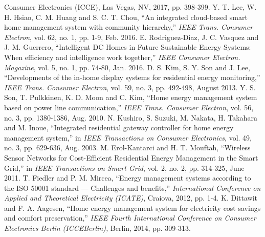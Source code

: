 \documentclass[a4paper,12pt,oneside]{article}
\begin{document}
\begin{thebibliography}{9}
{Consumer Electronics (ICCE)}, Las Vegas, NV, 2017, pp. 398-399.
Y. T. Lee, W. H. Hsiao, C. M. Huang and S. C. T. Chou, “An integrated
cloud-based smart home management system with community
hierarchy,” \emph{IEEE Trans. Consumer Electron}, vol. 62, no. 1, pp. 1-9, Feb.
2016.
E. Rodriguez-Diaz, J. C. Vasquez and J. M. Guerrero, “Intelligent DC
Homes in Future Sustainable Energy Systems: When efficiency and
intelligence work together,” \emph{IEEE Consumer Electron. Magazine}, vol. 5,
no. 1, pp. 74-80, Jan. 2016.
D. S. Kim, S. Y. Son and J. Lee, “Developments of the in-home display
systems for residential energy monitoring,” \emph{IEEE Trans. Consumer
Electron}, vol. 59, no. 3, pp. 492-498, August 2013.
Y. S. Son, T. Pulkkinen, K. D. Moon and C. Kim, “Home energy
management system based on power line communication,” \emph{IEEE Trans.
Consumer Electron}, vol. 56, no. 3, pp. 1380-1386, Aug. 2010.
N. Kushiro, S. Suzuki, M. Nakata, H. Takahara and M. Inoue,
“Integrated residential gateway controller for home energy management
system,” in\emph{ IEEE Transactions on Consumer Electronics}, vol. 49, no. 3,
pp. 629-636, Aug. 2003.
M. Erol-Kantarci and H. T. Mouftah, “Wireless Sensor Networks for
Cost-Efficient Residential Energy Management in the Smart Grid,” in\emph{
IEEE Transactions on Smart Grid}, vol. 2, no. 2, pp. 314-325, June 2011.
T. Fiedler and P. M. Mircea, “Energy management systems according to
the ISO 50001 standard — Challenges and benefits,” \emph{ International
Conference on Applied and Theoretical Electricity (ICATE)}, Craiova,
2012, pp. 1-4.
K. Dittawit and F. A. Aagesen, “Home energy management system for
electricity cost savings and comfort preservation,” \emph{IEEE Fourth
International Conference on Consumer Electronics Berlin (ICCEBerlin),}
Berlin, 2014, pp. 309-313.

\end{thebibliography}
\end{document}
